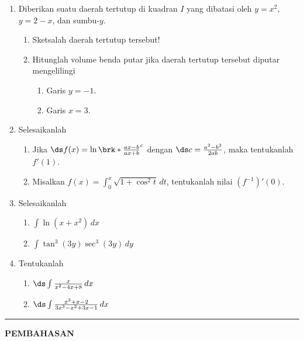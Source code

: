 \begin{enumerate}[leftmargin=*, label={\arabic*}.]
\item Diberikan suatu daerah tertutup di kuadran $I$ yang dibatasi oleh $y=x^{2}$, 
$y=2-x$, dan sumbu-$y$.
\begin{enumerate}[label={\alph*}.]
    \item Sketsalah daerah tertutup tersebut!
    \item Hitunglah volume benda putar jika daerah tertutup tersebut 
    diputar mengelilingi
    \begin{enumerate}[label={\roman*}.]
        \item Garis $y=-1$.
        \item Garis $x=3$.
    \end{enumerate}
\end{enumerate}
\item Selesaikanlah
\begin{enumerate}[label={\alph*}.]
    \item Jika $\ds f(x) = \ln\brk*{\frac{ax-b}{ax+b}}^{c}$ dengan 
    $\ds c=\frac{a^{2}-b^{2}}{2ab}$, maka tentukanlah $f'(1)$.
    \item Misalkan $f(x)=\int_0^{x}\sqrt{1+\cos^{2}t}\,dt$, tentukanlah 
    nilai $(f^{-1})'(0)$.
\end{enumerate}
\item Selesaikanlah
\begin{enumerate}[label={\alph*}.]
    \item $\int \ln (x+x^{2})\,dx$
    \item $\int \tan^{3}(3y)\sec^{3}(3y)\,dy$
\end{enumerate}
\item Tentukanlah
\begin{enumerate}[label={\alph*}.]
    \item $\ds \int \frac{x}{x^{2}-4x+8}\,dx$
    \item $\ds \int \frac{x^{2}+x-2}{3x^{3}-x^{2}+3x-1}\,dx$
\end{enumerate}
\end{enumerate}
\vspace{0.2cm}
\hrule height 1pt
\vspace{0.5cm}
\begin{center}
    \textbf{\large{PEMBAHASAN}}
\end{center}
